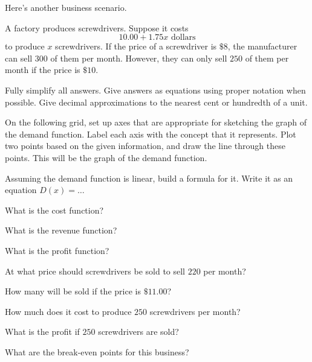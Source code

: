 Here's another business scenario.

A factory produces screwdrivers. Suppose it costs
\begin{equation*}
 10.00 + 1.75 x \text{ dollars}
\end{equation*}
to produce $x$ screwdrivers.
If the price of a screwdriver is $\$8$, the manufacturer can sell $300$ of them per month.
However, they can only sell $250$ of them per month if the price is $\$10$.

Fully simplify all answers.
Give answers as equations using proper notation when possible.
Give decimal approximations to the nearest cent or hundredth of a unit.

\begin{ProblemSet}
 \begin{Problem}[pencil space=0.5in]
  On the following grid, set up axes that are appropriate for sketching the graph of the demand function.
  Label each axis with the concept that it represents.
  Plot two points based on the given information, and draw the line through these points.
  This will be the graph of the demand function.
  \vspace{0.5in}

  \GraphingGridSmall

 \end{Problem}

 \begin{Problem}
  Assuming the demand function is linear, build a formula for it.
  Write it as an equation $D(x) = \dots$
 \end{Problem}

 \begin{Problem}
  What is the cost function?
 \end{Problem}

 \begin{Problem}
  What is the revenue function?
 \end{Problem}

 \begin{Problem}
  What is the profit function?
 \end{Problem}

 \begin{Problem}
  At what price should screwdrivers be sold to sell $220$ per month?
 \end{Problem}

 \begin{Problem}
  How many will be sold if the price is $\$11.00$?
 \end{Problem}

 \begin{Problem}
  How much does it cost to produce $250$ screwdrivers per month?
 \end{Problem}

 \begin{Problem}
  What is the profit if $250$ screwdrivers are sold?
 \end{Problem}

 \begin{Problem}
  What are the break-even points for this business?
 \end{Problem}

\end{ProblemSet}

